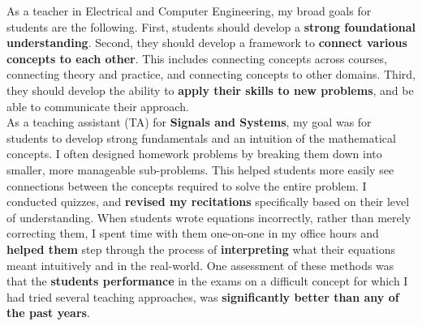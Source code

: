 \documentclass[10pt]{article}
\begin{document}
As a teacher in Electrical and Computer Engineering, my broad goals for students are the following. %
First, students should develop a \textbf{strong foundational understanding}. Second, they should develop a framework to \textbf{connect various concepts to each other}. This includes connecting concepts across courses, connecting theory and practice, and connecting concepts to other domains. Third, they should develop the ability to \textbf{apply their skills to new problems}, and be able to communicate their approach. \\%


As a teaching assistant (TA) for \textbf{Signals and Systems}, my goal was for students to develop strong fundamentals and an intuition of the mathematical concepts. 
I often designed homework problems by breaking them down into smaller, more manageable sub-problems. %
This helped students more easily see connections between the concepts required to solve the entire problem.
I conducted quizzes, and \textbf{revised my recitations} specifically based on their level of understanding. 
When students wrote equations incorrectly, rather than merely correcting them, I spent time with them one-on-one in my office hours and \textbf{helped them} step through the process of \textbf{interpreting} what their equations meant intuitively and in the real-world. 
One assessment of these methods was that the \textbf{students performance} in the exams on a difficult concept for which I had tried several teaching approaches, was \textbf{significantly better than any of the past years}. \\
\end{document}
